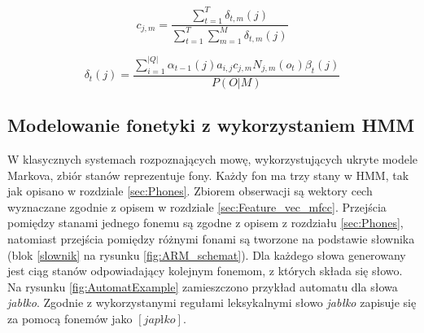 \documentclass[11pt]{article}
\newcommand{\refBlock}[1]{
	\hyperref[#1]{\ref*{#1}}
}
\begin{document}
	   \begin{equation}
	   c_{j,m}=\frac{\sum_{t=1}^T\delta_{t,m}(j)}{\sum_{t=1}^T\sum_{m=1}^M\delta_{t,m}(j)}
	   \label{eqn:b_c_c}
	   \end{equation}
	   
	   \begin{equation}
	   \delta_t(j)= \frac{\sum_{i=1}^{|Q|}\alpha_{t-1}(j)a_{i,j}c_{j,m}N_{j,m}(o_{t})\beta_{t}(j)}{P(O|M)}
	   \label{eqn:delta}
	   \end{equation}
	   
    \subsection{Modelowanie fonetyki z wykorzystaniem HMM }
    \label{sec:hmm_in_asr}
    W klasycznych systemach rozpoznających mowę, wykorzystujących ukryte modele Markova, zbiór stanów reprezentuje fony. Każdy fon ma trzy stany w HMM, tak jak opisano w rozdziale \ref{sec:Phones}. Zbiorem obserwacji są wektory cech wyznaczane zgodnie z opisem w rozdziale \ref{sec:Feature_vec_mfcc}. Przejścia pomiędzy stanami jednego fonemu są zgodne z opisem z rozdziału \ref{sec:Phones}, natomiast przejścia pomiędzy różnymi fonami są tworzone na podstawie słownika (blok \refBlock{slownik} na rysunku \ref{fig:ARM_schemat}). Dla każdego słowa generowany jest ciąg stanów odpowiadający kolejnym fonemom, z których składa się słowo. \\
    Na rysunku \ref{fig:AutomatExample} zamieszczono przykład automatu dla słowa \textit{jabłko}. Zgodnie z wykorzystanymi regułami leksykalnymi słowo \textit{jabłko} zapisuje się za pomocą fonemów jako $[j a p ł k o]$. \\
    
\end{document}
